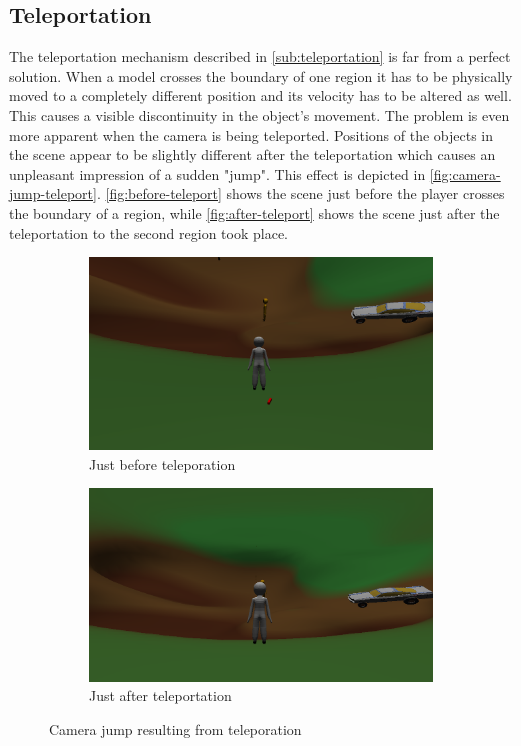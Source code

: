 \subsection{Teleportation}
The teleportation mechanism described in \autoref{sub:teleportation} is far from a perfect solution.
When a model crosses the boundary of one region it has to be physically moved to a completely different position and its velocity has to be altered as well.
This causes a visible discontinuity in the object's movement.
The problem is even more apparent when the camera is being teleported.
Positions of the objects in the scene appear to be slightly different after the teleportation which causes an unpleasant impression of a sudden "jump".
This effect is depicted in \autoref{fig:camera-jump-teleport}.
\autoref{fig:before-teleport} shows the scene just before the player crosses the boundary of a region, while \autoref{fig:after-teleport} shows the scene just after the teleportation to the second region took place.
\begin{figure}[!htb]
    \centering
    \begin{subfigure}[b]{0.475\textwidth}
        \centering
        \includegraphics[width=\textwidth]{chapters/problems/resources/just-before.png}
        \caption[]%
        {{\small Just before teleporation}}
        \label{fig:before-teleport}
    \end{subfigure}
    \hfill
    \begin{subfigure}[b]{0.475\textwidth}
        \centering
        \includegraphics[width=\textwidth]{chapters/problems/resources/just-after.png}
        \caption[]%
        {{\small Just after teleportation}}
        \label{fig:after-teleport}
    \end{subfigure}
    \caption[]
    {\small Camera jump resulting from teleporation}
    \label{fig:camera-jump-teleport}
\end{figure}
